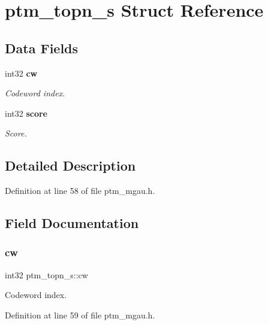 \section{ptm\+\_\+topn\+\_\+s Struct Reference}
\label{structptm__topn__s}
\subsection*{Data Fields}
\begin{DoxyCompactItemize}
\item 
int32 \textbf{ cw}
\begin{DoxyCompactList}\small\item\em Codeword index. \end{DoxyCompactList}\item 
int32 \textbf{ score}
\begin{DoxyCompactList}\small\item\em Score. \end{DoxyCompactList}\end{DoxyCompactItemize}


\subsection{Detailed Description}


Definition at line 58 of file ptm\+\_\+mgau.\+h.



\subsection{Field Documentation}
\mbox{\label{structptm__topn__s_a8a46095488efefa2714214a7a74117b1}} 
\subsubsection{cw}
{\footnotesize\ttfamily int32 ptm\+\_\+topn\+\_\+s\+::cw}



Codeword index. 



Definition at line 59 of file ptm\+\_\+mgau.\+h.

\mbox{\label{structptm__topn__s_aa2080ad2d4f038cdbfbf46bf90884f56}} 
